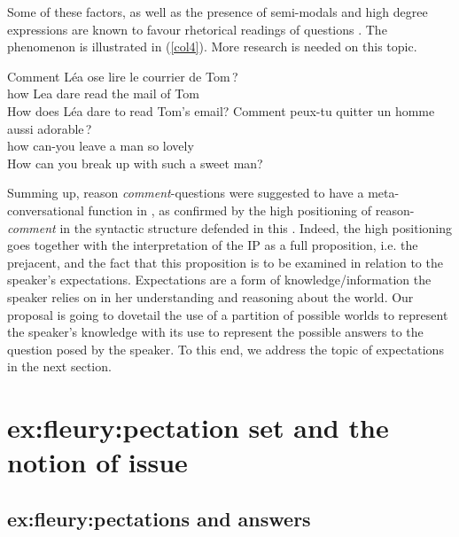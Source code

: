 \documentclass[output=paper,colorlinks,citecolor=brown,
]{langscibook}
\begin{document}
Some of these factors, as well as the presence of semi-modals and high degree expressions
are known to favour rhetorical readings of questions \citep{Sadock71,DesmetsGautier09}. The phenomenon is illustrated in (\ref{col4}). More research is needed on this topic.
\begin{exe}
\ex\label{col4}  
\begin{xlist}
\ex  \gll Comment L\'ea ose lire le courrier de Tom\,?   \\
how Lea dare read the mail of Tom \\
\glt How does L\'ea dare to read Tom's email?
\ex  \gll Comment peux-tu quitter un homme aussi adorable\,?  \\
how can-you leave a man so lovely  \\
\glt How can you break up with such a sweet man?
\end{xlist}
\end{exe}

Summing up, reason \textit{comment}-questions were suggested to have a meta-con\-ver\-sa\-tional function in , as confirmed by the high positioning of reason-\textit{comment} in the syntactic structure defended in this . 
Indeed, the high positioning goes together with the interpretation of the IP as a full proposition, i.e. the prejacent, and the fact that this proposition is to be examined in relation to the speaker's expectations. Expectations are a form of knowledge/information the speaker relies on in her understanding and reasoning about the world. Our proposal is going to dovetail the use of a partition of possible worlds to represent the speaker's knowledge with its use to represent the possible answers to the question posed by the speaker. To this end, we address the topic of expectations in the next section.


\section{ex:fleury:pectation set and the notion of \mbox{issue}}\label{sec:fleury:expSet}%


\subsection{ex:fleury:pectations and answers} %
\end{document}
